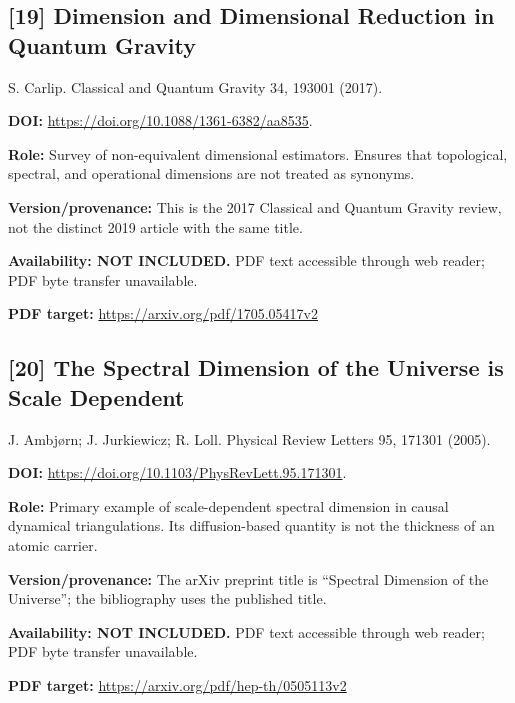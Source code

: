 \documentclass[11pt,a4paper]{article}
\begin{document}
\begin{minipage}{\textwidth}
\subsection*{[19] Dimension and Dimensional Reduction in Quantum Gravity}
S. Carlip. Classical and Quantum Gravity 34, 193001 (2017).

\textbf{DOI:} \url{https://doi.org/10.1088/1361-6382/aa8535}.

\textbf{Role:} Survey of non-equivalent dimensional estimators. Ensures that topological, spectral, and operational dimensions are not treated as synonyms.

\textbf{Version/provenance:} This is the 2017 Classical and Quantum Gravity review, not the distinct 2019 article with the same title.

\textbf{Availability: NOT INCLUDED.} PDF text accessible through web reader; PDF byte transfer unavailable.\par
\textbf{PDF target:} \url{https://arxiv.org/pdf/1705.05417v2}
\end{minipage}
\par\medskip
\begin{minipage}{\textwidth}
\subsection*{[20] The Spectral Dimension of the Universe is Scale Dependent}
J. Ambj\o rn; J. Jurkiewicz; R. Loll. Physical Review Letters 95, 171301 (2005).

\textbf{DOI:} \url{https://doi.org/10.1103/PhysRevLett.95.171301}.

\textbf{Role:} Primary example of scale-dependent spectral dimension in causal dynamical triangulations. Its diffusion-based quantity is not the thickness of an atomic carrier.

\textbf{Version/provenance:} The arXiv preprint title is ``Spectral Dimension of the Universe''; the bibliography uses the published title.

\textbf{Availability: NOT INCLUDED.} PDF text accessible through web reader; PDF byte transfer unavailable.\par
\textbf{PDF target:} \url{https://arxiv.org/pdf/hep-th/0505113v2}
\end{minipage}
\par\medskip
\end{document}
